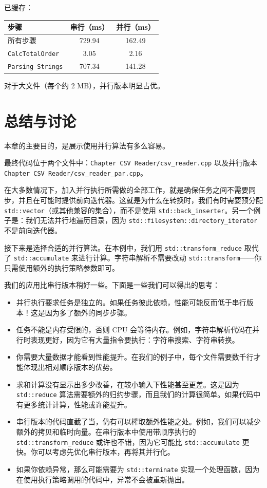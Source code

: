 已缓存：

\begin{table}[H]
\centering
\begin{tabularx}{\textwidth}{X c c}
\toprule
步骤 & 串行（ms） & 并行（ms） \\
\midrule
所有步骤 & 729.94 & 162.49 \\
\texttt{CalcTotalOrder} & 3.05 & 2.16 \\
\texttt{Parsing Strings} & 707.34 & 141.28 \\
\bottomrule
\end{tabularx}
\end{table}

对于大文件（每个约 2 MB），并行版本明显占优。

\section{总结与讨论}

本章的主要目的，是展示使用并行算法有多么容易。

最终代码位于两个文件中：\texttt{Chapter CSV Reader/csv\_reader.cpp} 以及并行版本 \texttt{Chapter CSV Reader/csv\_reader\_par.cpp}。

在大多数情况下，加入并行执行所需做的全部工作，就是确保任务之间不需要同步，并且在可能时提供前向迭代器。这就是为什么在转换时，我们有时需要预分配 \texttt{std::vector}（或其他兼容的集合），而不是使用 \texttt{std::back\_inserter}。另一个例子是：我们无法并行地遍历目录，因为 \texttt{std::filesystem::directory\_iterator} 不是前向迭代器。

接下来是选择合适的并行算法。在本例中，我们用 \texttt{std::transform\_reduce} 取代了 \texttt{std::accumulate} 来进行计算。字符串解析不需要改动 \texttt{std::transform}——你只需使用额外的执行策略参数即可。

我们的应用比串行版本稍好一些。下面是一些我们可以得出的思考：
\begin{itemize}
\item 并行执行要求任务是独立的。如果任务彼此依赖，性能可能反而低于串行版本！这是因为多了额外的同步步骤。
\item 任务不能是内存受限的，否则 CPU 会等待内存。例如，字符串解析代码在并行时表现更好，因为它有大量指令要执行：字符串搜索、字符串转换。
\item 你需要大量数据才能看到性能提升。在我们的例子中，每个文件需要数千行才能体现出相对顺序版本的优势。
\item 求和计算没有显示出多少改善，在较小输入下性能甚至更差。这是因为 \texttt{std::reduce} 算法需要额外的归约步骤，而且我们的计算很简单。如果代码中有更多统计计算，性能或许能提升。
\item 串行版本的代码直截了当，仍有可以榨取额外性能之处。例如，我们可以减少额外的拷贝和临时向量。在串行版本中使用带顺序执行的 \texttt{std::transform\_reduce} 或许也不错，因为它可能比 \texttt{std::accumulate} 更快。你可以考虑先优化串行版本，再将其并行化。
\item 如果你依赖异常，那么可能需要为 \texttt{std::terminate} 实现一个处理函数，因为在使用执行策略调用的代码中，异常不会被重新抛出。
\end{itemize}

